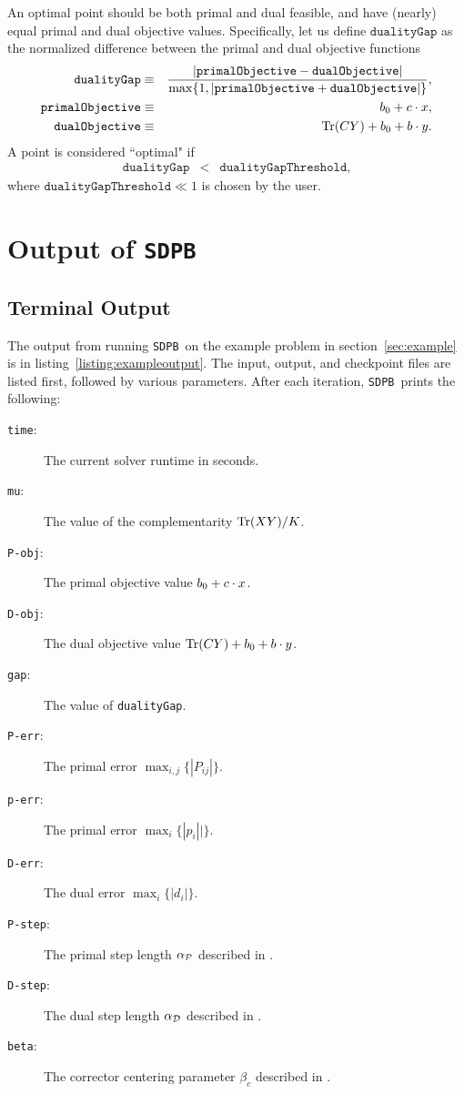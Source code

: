 \documentclass[12pt]{article}
\numberwithin{equation}{section}
\renewcommand{\be}{\begin{eqnarray}}
\renewcommand{\ee}{\end{eqnarray}}
\newcommand\nn{\nonumber}
\newcommand\SDPB{\texttt{SDPB}}
\begin{document}
An optimal point should be both primal and dual feasible, and have (nearly) equal primal and dual objective values.  Specifically, let us define $\texttt{dualityGap}$ as the normalized difference between the primal and dual objective functions
\be
\texttt{dualityGap} &\equiv& \frac{|\texttt{primalObjective} - \texttt{dualObjective}|}{\max\{1, |\texttt{primalObjective} + \texttt{dualObjective}|\}}, \nn\\
\texttt{primalObjective} &\equiv& b_0+c\. x, \nn\\
\texttt{dualObjective} &\equiv& \Tr(CY)+b_0+b\.y.
\ee
A point is considered ``optimal" if
\be
\texttt{dualityGap} &<& \texttt{dualityGapThreshold},
\ee
where $\texttt{dualityGapThreshold} \ll 1$ is chosen by the user.


\section{Output of \SDPB}

\subsection{Terminal Output}

The output from running \SDPB\ on the example problem in section~\ref{sec:example} is in listing~\ref{listing:exampleoutput}.  The input, output, and checkpoint files are listed first, followed by various parameters.  After each iteration, \SDPB\ prints the following:
\begin{description}
\item[\texttt{time}:] The current solver runtime in seconds.
\item[\texttt{mu}:] The value of the complementarity $\Tr(XY)/K$.
\item[\texttt{P-obj}:] The primal objective value $b_0+c\.x$.
\item[\texttt{D-obj}:] The dual objective value $\Tr(CY)+b_0+b\.y$.
\item[\texttt{gap}:] The value of \texttt{dualityGap}.
\item[\texttt{P-err}:] The primal error $\max_{i,j}\{|P_{ij}|\}$.
\item[\texttt{p-err}:] The primal error $\max_{i}\{|p_i||\}$.
\item[\texttt{D-err}:] The dual error $\max_i\{|d_i|\}$.
\item[\texttt{P-step}:] The primal step length $\alpha_\cP$ described in \cite{DSD}.
\item[\texttt{D-step}:] The dual step length $\alpha_\cD$ described in \cite{DSD}.
\item[\texttt{beta}:]  The corrector centering parameter $\beta_c$ described in \cite{DSD}.
\end{description}
\end{document}
